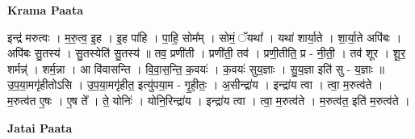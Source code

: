 \documentclass[17pt]{extarticle}
\begin{document}
\textbf{Krama Paata} \newline

इन्द्र॑ मरुत्वः । म॒रु॒त्व॒ इ॒ह । इ॒ह पा॑हि । पा॒हि॒ सोम᳚म् । सोमं॒ ॅयथा᳚ । यथा॑ शार्या॒ते । शा॒र्या॒ते अपि॑बः । अपि॑बः सु॒तस्य॑ । सु॒तस्येति॑ सु॒तस्य॑ ॥ तव॒ प्रणी॑ती । प्रणी॑ती॒ तव॑ । प्रणी॒तीति॒ प्र - नी॒ती॒ । तव॑ शूर । शू॒र॒ शर्मन्न्॑ । शर्म॒न्ना । आ वि॑वासन्ति । वि॒वा॒स॒न्ति॒ क॒वयः॑ । क॒वयः॑ सुय॒ज्ञाः । सु॒य॒ज्ञा इति॑ सु - य॒ज्ञाः ॥ उ॒प॒या॒मगृ॑हीतोऽसि । उ॒प॒या॒मगृ॑हीत॒ इत्यु॑पया॒म - गृ॒ही॒तः॒ । अ॒सीन्द्रा॑य । इन्द्रा॑य त्वा । त्वा॒ म॒रुत्व॑ते । म॒रुत्व॑त ए॒षः । ए॒ष ते᳚ । ते॒ योनिः॑ । योनि॒रिन्द्रा॑य । इन्द्रा॑य त्वा । त्वा॒ म॒रुत्व॑ते । म॒रुत्व॑त॒ इति॑ म॒रुत्व॑ते । \newline

\textbf{Jatai Paata} \newline
\end{document}

